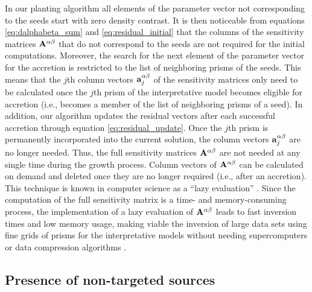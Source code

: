 In our planting algorithm all elements of the parameter vector not corresponding
to the seeds start with zero density contrast.
It is then noticeable from equations
\ref{eq:dalphabeta_sum} and \ref{eq:residual_initial} that
the columns of the sensitivity
matrices $\mathbf{A}^{\alpha\beta}$ that do not correspond to
the seeds are not required for the initial computations.
Moreover, the search for the next element of the parameter vector for the
accretion is restricted to the list of neighboring prisms of the seeds.
This means that the $j$th column vectors
$\mathbf{a}_j^{\alpha\beta}$ of the sensitivity matrices only need to be
calculated once the $j$th prism of the interpretative model becomes eligible
for accretion (i.e., becomes a member of the list of neighboring prisms
of a seed).
In addition, our algorithm updates the residual vectors after each
successful accretion through equation \ref{eq:residual_update}.
Once the $j$th prism is permanently incorporated
into the current solution, the column vectors
$\mathbf{a}_j^{\alpha\beta}$ are no longer needed.
Thus, the full sensitivity matrices $\mathbf{A}^{\alpha\beta}$ are not needed at
any single time during the growth process.
Column vectors of $\mathbf{A}^{\alpha\beta}$ can be
calculated on demand and deleted once they are no longer required
(i.e., after an accretion).
This technique is known in computer science as a ``lazy evaluation''
\citep{lazyeval}.
Since the computation of the full sensitivity matrix is a
time- and memory-consuming process, the implementation of a lazy evaluation of
$\mathbf{A}^{\alpha\beta}$
leads to fast inversion times and low memory usage, making viable the inversion
of large data sets using fine grids of prisms for the interpretative models
without needing supercomputers or data compression algorithms
\citep[e.g.,][]{portniaguine02}. 


\subsection{Presence of non-targeted sources}

